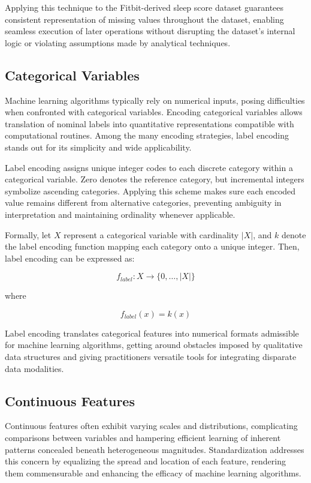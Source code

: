 \documentclass[10pt]{extarticle}
\begin{document}
Applying this technique to the Fitbit-derived sleep score dataset guarantees consistent representation of missing values throughout the dataset, enabling seamless execution of later operations without disrupting the dataset's internal logic or violating assumptions made by analytical techniques.

\subsection{Categorical Variables}

Machine learning algorithms typically rely on numerical inputs, posing difficulties when confronted with categorical variables. Encoding categorical variables allows translation of nominal labels into quantitative representations compatible with computational routines. Among the many encoding strategies, label encoding stands out for its simplicity and wide applicability.

Label encoding assigns unique integer codes to each discrete category within a categorical variable. Zero denotes the reference category, but incremental integers symbolize ascending categories. Applying this scheme makes sure each encoded value remains different from alternative categories, preventing ambiguity in interpretation and maintaining ordinality whenever applicable.

Formally, let \(X\) represent a categorical variable with cardinality \(\left|X\right|\), and \(k\) denote the label encoding function mapping each category onto a unique integer. Then, label encoding can be expressed as:

\[
f_{label}: X \rightarrow \{0, \ldots , \left|X\right|\}
\]

where

\[
f_{label}(x) = k(x)
\]

Label encoding translates categorical features into numerical formats admissible for machine learning algorithms, getting around obstacles imposed by qualitative data structures and giving practitioners versatile tools for integrating disparate data modalities.

\subsection{Continuous Features}

Continuous features often exhibit varying scales and distributions, complicating comparisons between variables and hampering efficient learning of inherent patterns concealed beneath heterogeneous magnitudes. Standardization addresses this concern by equalizing the spread and location of each feature, rendering them commensurable and enhancing the efficacy of machine learning algorithms.
\end{document}
